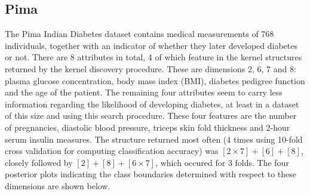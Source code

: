 \documentclass[a4paper,12pt ]{report}
\begin{document}
\subsection{Pima}

The Pima Indian Diabetes dataset contains medical measurements of 768 individuals, together with an indicator of whether they later developed diabetes or not. There are 8 attributes in total, 4 of which feature in the kernel structures returned by the kernel discovery procedure. 
These are dimensions 2, 6, 7 and 8: plasma glucose concentration, body mass index (BMI), diabetes pedigree function and the age of the patient. The remaining four attributes seem to carry less information regarding the likelihood of developing diabetes, at least 
in a dataset of this size and using this search procedure. These four features are the number of pregnancies, diastolic blood pressure, triceps skin fold thickness and 2-hour serum insulin measures. The structure returned most often (4 times using 10-fold cross validation 
for computing classification accuracy) was $[2\times7] + [6] + [8]$, closely followed by $[2]+[8]+[6 \times 7]$, which occured for 3 folds. The four posterior plots indicating the class boundaries determined with respect to these dimensions are shown below. 
\end{document}
